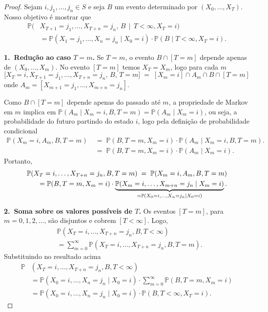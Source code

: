\documentclass[12pt,letterpaper]{article}
\begin{document}
\begin{proof}
  Sejam $i,j_1,\dots,j_n \in S$ e seja $B$ um evento determinado por
  $(X_0,\dots,X_T)$.  Nosso objetivo é mostrar que
  \begin{align*}
    \mathbb{P} ( & X_{T+1}=j_1,\dots,X_{T+n}=j_n,\, B \,\mid \,
                   T<\infty, X_T=i )\\ & = \mathbb{P}  (   X_{1}=j_1,\dots,X_n=j_n \mid  X_0=i)\cdot 
                                         \mathbb{P}(B \mid T<\infty, X_T=i).
  \end{align*}


\noindent\textbf{1.~Redução ao caso $T=m$.}  
Se $T=m$, o evento $B \cap [T=m]$ depende apenas de $(X_0,\dots,X_m)$.
No evento $[T=m]$ temos $X_T = X_m$, logo para cada $m$
\[
  \big[ X_T=i, X_{T+1}=j_1,\dots,X_{T+n}=j_n,\, B,\, T=m \big] \;=\;
  [ X_m=i ] \cap A_m  \cap B \cap [T=m]
\]
onde $A_m=[X_{m+1}=j_1,\dots,X_{m+n}=j_n]$.

Como $B \cap [T=m]$ depende apenas do passado até $m$, a propriedade de
Markov em $m$ implica em
\( \mathbb{P}(A_m \mid X_m=i, B, T=m) = \mathbb{P}(A_m \mid X_m=i) \),
ou seja, a probabilidade do futuro partindo do estado $i$, logo pela
definição de probabilidade condicional
\begin{align*}
\mathbb{P}(X_m=i, A_m, B, T=m) 
&\;=\; \mathbb{P}(B, T=m, X_m=i)\cdot \mathbb{P}(A_m \mid X_m=i, B, T=m). \\
&\;=\; \mathbb{P}(B, T=m, X_m=i)\cdot  \mathbb{P}(A_m \mid X_m=i).
\end{align*}
Portanto,
\begin{align}\notag
\mathbb{P}(X_T=i,\dots,X_{T+n}=j_n, B, T=m)
\;=\;\mathbb{P}(X_m=i, A_m, B, T=m) 
\\=
\label{eq:1}
  \mathbb{P}(B, T=m, X_m=i)\cdot
  \underbrace{\mathbb{P}(X_m=i,\dots,X_{m+n}=j_n \mid X_m=i)}_{=\mathbb{P}(X_0=i,\dots,X_{n}=j_n \mid X_0=i)}.
\end{align}

\medskip

\noindent\textbf{2.~Soma sobre os valores possíveis de $T$.}  
Os eventos $[T=m]$, para $m=0,1,2,\dots$, são disjuntos e cobrem
$[T<\infty]$.  Logo,
\begin{align*}
&\mathbb{P}(X_T=i,\dots,X_{T+n}=j_n, B, T<\infty) \\
&= \sum_{m=0}^\infty \mathbb{P}(X_T=i,\dots,X_{T+n}=j_n, B, T=m).
\end{align*}
Substituindo  no resultado acima
\begin{align*}
\mathbb{P}&(X_T=i,\dots,X_{T+n}=j_n, B, T<\infty) \\
&=\mathbb{P}(X_0=i,\dots,X_n=j_n \mid X_0=i)\cdot \sum_{m=0}^\infty \mathbb{P}(B, T=m, X_m=i) \\
&=\mathbb{P}(X_0=i,\dots,X_n=j_n \mid X_0=i)\cdot\mathbb{P}(B, T<\infty, X_T=i).
\end{align*}


\end{proof}
\end{document}
